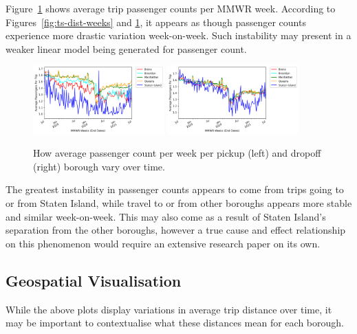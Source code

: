 \documentclass[11pt]{article}
\begin{document}
Figure~\ref{fig:ts-pass-count-weeks} shows average trip passenger counts per MMWR week.
According to Figures~\ref{fig:ts-dist-weeks} and \ref{fig:ts-pass-count-weeks}, 
it appears as though passenger counts experience more drastic variation week-on-week.
Such instability may present in a weaker linear model being generated for passenger count.
\begin{figure}[h]
    \includegraphics[width=0.45\textwidth]{../plots/time-series-Average Passengers Per Trip-vs-MMWR Weeks (End Dates)-by-pu_borough.png}
    \includegraphics[width=0.45\textwidth]{../plots/time-series-Average Passengers Per Trip-vs-MMWR Weeks (End Dates)-by-do_borough.png}
    \centering
    \caption{How average passenger count per week per pickup (left) and dropoff (right) borough vary over time.} %
    \label{fig:ts-pass-count-weeks}
\end{figure}

The greatest instability in passenger counts appears to come from trips going to or from Staten Island,
while travel to or from other boroughs appears more stable and similar week-on-week. 
This may also come as a result of Staten Island's separation from the other boroughs,
however a true cause and effect relationship on this phenomenon would require an extensive research paper on its own.

\subsection{Geospatial Visualisation}

While the above plots display variations in average trip distance over time, 
it may be important to contextualise what these distances mean for each borough.
\end{document}
